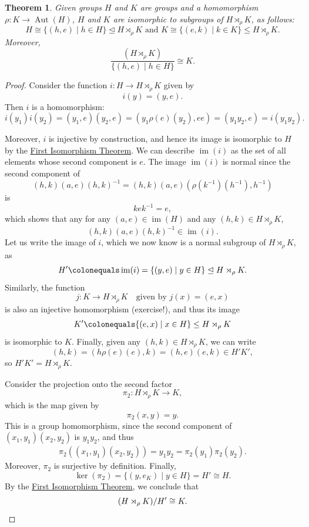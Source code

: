 \documentclass[12pt]{report}
\newtheorem{theorem}{Theorem}[chapter]
\numberwithin{equation}{section}
\numberwithin{theorem}{chapter}
\theoremstyle{definition}
\newtheorem*{basic properties}{Basic Properties}
\newtheorem*{Important Remark}{Important Remark}
\def\sdp{\rtimes}
\renewcommand{\ker}{\operatorname{ker}}
\DeclareMathOperator{\im}{im}
\DeclareMathOperator{\Aut}{Aut}
\def\norm{\mathrel{\unlhd}}
\begin{document}
\begin{theorem}\label{semidirect product}
Given groups $H$ and $K$ are groups and a homomorphism $\rho\!: K \to \Aut(H)$, $H$ and $K$ are isomorphic to subgroups of $H \sdp_\rho K$, as follows:
$$H \cong \{(h,e)\mid h\in H\} \norm H \sdp_\rho K \text{ and } K \cong \{(e,k)\mid k\in K\} \leq H \sdp_\rho K.$$
Moreover,
$$\frac{(H \sdp_\rho K )}{\{(h,e)\mid h\in H\}} \cong K.$$
\end{theorem}

\begin{proof}
Consider the function $i\!: H \to H \sdp_\rho K$ given by 
$$i(y) = (y, e).$$
Then $i$ is a homomorphism:
$$i(y_1) i(y_2) = (y_1,e)(y_2,e) = (y_1\rho(e)(y_2) , ee) = (y_1 y_2, e) = i(y_1y_2).$$

Moreover, $i$ is injective by construction, and hence its image is isomorphic to $H$ by the \hyperref[first iso thm]{First Isomorphism Theorem}. We can describe $\im(i)$ as the set of all elements whose second component is $e$.
The image $\im(i)$ is normal since the second component of
$$(h,k) (a, e) (h,k)^{-1} = (h,k) (a, e) (\rho(k^{-1})(h^{-1}), h^{-1})$$
is
$$kek^{-1} = e,$$
which shows that any for any $(a,e) \in \im(H)$ and any $(h,k) \in H \sdp_\rho K$,
$$(h,k) (a, e) (h,k)^{-1} \in \im(i).$$
Let us write the image of $i$, which we now know is a normal subgroup of $H \sdp_\rho K$, as
$$H' \colonequals \im(i) = \{(y,e) \mid y \in H\} \norm  H \sdp_\rho K.$$
Similarly, the function
$$j\!: K \to H \sdp_\rho K \quad \text{given by } j(x) = (e,x)$$
is also an injective homomorphism (exercise!), and thus its image 
$$K' \colonequals \{(e,x) \mid x \in H \} \leq H \sdp_\rho K$$
is isomorphic to $K$. 
Finally, given any $(h,k) \in H \sdp_{\rho} K$, we can write
$$ (h,k) = (h\rho(e)(e),k) = (h,e)(e,k) \in H'K',$$
so $H'K'= H \sdp_\rho K$.
%

Consider the projection onto the second factor 
$$\pi_2\!:H \sdp_\rho K \to  K,$$
which is the map given by 
$$\pi_2(x,y)=y.$$
This is a group homomorphism, since the second component of $(x_1,y_1)(x_2,y_2)$ is $y_1y_2$, and thus
$$\begin{aligned}
\pi_2(	(x_1,y_1)(x_2,y_2) ) = y_1y_2 = \pi_2(y_1) \pi_2(y_2).
\end{aligned}$$
Moreover, $\pi_2$ is surjective by definition. Finally, 
$$\ker(\pi_2)=\{(y,e_K)\mid y\in H\}=H'\cong H.$$
By the \hyperref[first iso thm]{First Isomorphism Theorem}, we conclude that 
$$(H \sdp_\rho K )/ H' \cong K.\qedhere$$
\end{proof}
\end{document}
